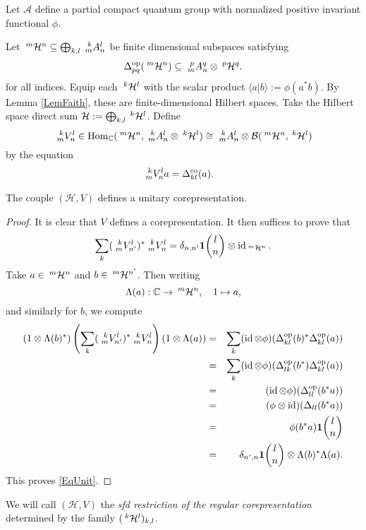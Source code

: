 \begin{Exa} \label{exa:rep-regular}
  Let $\mathscr{A}$ define a partial compact quantum group with normalized positive invariant functional $\phi$. 

  Let $\Gru{\mathcal{H}}{m}{n} \subseteq \bigoplus_{k,l}
  \Gr{A}{k}{l}{m}{n}$ be finite dimensional subspaces satisfying
\begin{align*}
  \Delta^{\op}_{pq}(\Gru{\mathcal{H}}{m}{n}) \subseteq
 \Gr{A}{p}{q}{m}{n} \otimes \Gru{\mathcal{H}}{p}{q}.
\end{align*}
for all indices.
Equip each $\Gru{\mathcal{H}}{k}{l}$ with the scalar product $\langle
a|b\rangle:=\phi(a^{*}b)$. By Lemma \ref{LemFaith}, these are finite-dimensional Hilbert spaces. Take the Hilbert space direct sum
$\mathcal{H}:=\bigoplus_{k,l} \Gru{\mathcal{H}}{k}{l}$.
Define \[ \Gr{V}{k}{l}{m}{n} \in \Hom_\C(\Gru{\mathcal{H}}{m}{n}, \Gr{A}{k}{l}{m}{n} \otimes \Gru{\mathcal{H}}{k}{l}) \cong \Gr{A}{k}{l}{m}{n} \otimes 
\mathcal{B}(\Gru{\mathcal{H}}{m}{n},\Gru{\mathcal{H}}{k}{l})\]  by the
equation
\begin{align*}
  \Gr{V}{k}{l}{m}{n}a &= \Delta^{\co}_{kl}(a).
\end{align*}

\begin{Lem} The couple $(\mathcal{H},V)$ defines a unitary corepresentation. 
\end{Lem} 
\begin{proof} It is clear that $V$ defines a corepresentation. It then suffices to prove that \begin{equation}\label{EqUnit} \sum_{k} (\Gr{V}{k}{l}{m}{n'})^* \Gr{V}{k}{l}{m}{n} = \delta_{n,n'}\UnitC{l}{n}\otimes \id_{\Gru{\Hsp}{m}{n}}.\end{equation} Take $a\in \Gru{\Hsp}{m}{n}$ and $b\in \Gru{\Hsp}{m}{n'}$. Then writing \[\Lambda(a): \C\rightarrow \Gru{\Hsp}{m}{n}, \quad 1\mapsto a,\] and similarly for $b$, we compute \begin{eqnarray*}(1\otimes \Lambda(b)^*)\left(\sum_{k} (\Gr{V}{k}{l}{m}{n'})^* \Gr{V}{k}{l}{m}{n}\right) (1\otimes \Lambda(a)) &=& \sum_k (\id\otimes \phi)(\Delta_{kl}^{\op}(b)^*\Delta_{kl}^{\op}(a))\\ &=&  \sum_k (\id\otimes \phi)(\Delta_{lk}^{\op}(b^*)\Delta_{kl}^{\op}(a)) \\ &=& (\id\otimes \phi)(\Delta_{ll}^{\op}(b^*a))\\ &=&  (\phi\otimes \id)(\Delta_{ll}(b^*a)) \\ &=& \phi(b^*a)\UnitC{l}{n} \\&=& \delta_{n',n} \UnitC{l}{n} \otimes \Lambda(b)^*\Lambda(a).\end{eqnarray*} 
This proves \eqref{EqUnit}.
\end{proof} 

We will call $(\mathcal{H},V)$  the 
\emph{sfd restriction of the regular corepresentation}
determined by the family $(\Gru{\mathcal{H}}{k}{l})_{k,l}$. 
\end{Exa}

